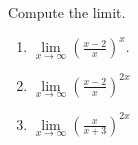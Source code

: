 Compute the limit. 
\begin{enumerate}[ref={\fcProblemRef}]
\item \label{problemlimxtoinfty((x-2)/x)^x} $\displaystyle\lim\limits_{x\to\infty}\left(\frac{x-2}{x}\right)^x.$

\item $\displaystyle\lim\limits_{x\to\infty} \left(\frac{x-2 }{x} \right)^{2 x}$ 

\item $\displaystyle \lim\limits_{x\to\infty} \left(\frac{x}{ x + 3} \right)^{2x}$ 

\end{enumerate}
